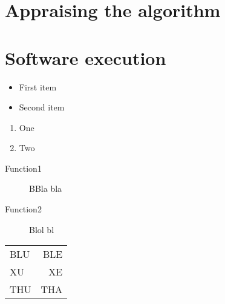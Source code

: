 \documentclass[titlepage]{article}
\begin{document}
    \section{Appraising the algorithm}
    \section{Software execution}
    
    \begin{itemize}
        \item First item
        \item Second item
    \end{itemize}

    \begin{enumerate}
        \item One
        \item Two
    \end{enumerate}

    \begin{description}
        \item[Function1] BBla bla
        \item[Function2] Blol bl 
    \end{description}
    
    \begin{tabular}{lr}
        BLU & BLE\\
        XU & XE\\
        THU & THA\\
    \end{tabular}
\end{document}
